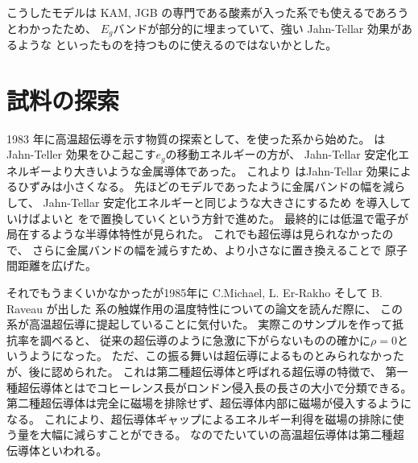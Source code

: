 \documentclass[11pt,dvipdfmx,a4paper]{jsarticle}
\begin{document}
こうしたモデルは KAM, JGB の専門である酸素が入った系でも使えるであろうとわかったため、
\(E_g\)バンドが部分的に埋まっていて、強い Jahn-Tellar 効果があるような
といったものを持つものに使えるのではないかとした。

\section{試料の探索}
1983 年に高温超伝導を示す物質の探索として、を使った系から始めた。
はJahn-Teller 効果をひこ起こす\(e_g\)の移動エネルギーの方が、
Jahn-Tellar 安定化エネルギーより大きいような金属導体であった。
これより はJahn-Tellar 効果によるひずみは小さくなる。
先ほどのモデルであったように金属バンドの幅を減らして、
Jahn-Tellar 安定化エネルギーと同じような大きさにするため  を導入していけばよいと
をで置換していくという方針で進めた。
最終的には低温で電子が局在するような半導体特性が見られた。
これでも超伝導は見られなかったので、
さらに金属バンドの幅を減らすため、より小さなに置き換えることで
原子間距離を広げた。

それでもうまくいかなかったが1985年に C.Michael, L. Er-Rakho そして B. Raveau が出した
系の触媒作用の温度特性についての論文を読んだ際に、
この系が高温超伝導に提起していることに気付いた。
実際このサンプルを作って抵抗率を調べると、
従来の超伝導のように急激に下がらないものの確かに\(\rho=0\)というようになった。
ただ、この振る舞いは超伝導によるものとみられなかったが、後に認められた。
これは第二種超伝導体と呼ばれる超伝導の特徴で、
第一種超伝導体とはでコヒーレンス長がロンドン侵入長の長さの大小で分類できる。
第二種超伝導体は完全に磁場を排除せず、超伝導体内部に磁場が侵入するようになる。
これにより、超伝導体ギャップによるエネルギー利得を磁場の排除に使う量を大幅に減らすことができる。
なのでたいていの高温超伝導体は第二種超伝導体といわれる。



\end{document}
